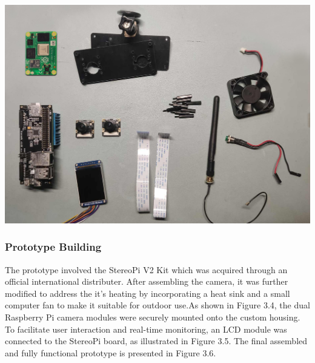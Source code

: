 \begin{center}
	\includegraphics[width=\textwidth]{Parts.png}
\end{center}



\subsubsection{Prototype Building}
The prototype involved the StereoPi V2 Kit which was acquired through an official international distributer. After assembling the camera, it was further modified to address the it's heating by incorporating a heat sink and a small computer fan to make it suitable for outdoor use.As shown in Figure 3.4, the dual Raspberry Pi camera modules were securely mounted onto the custom housing. To facilitate user interaction and real-time monitoring, an LCD module was connected to the StereoPi board, as illustrated in Figure 3.5. The final assembled and fully functional prototype is presented in Figure 3.6.



